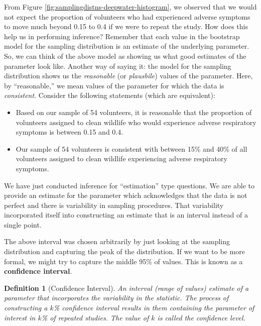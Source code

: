\documentclass[
]{book}
\providecommand{\tightlist}{%
  \setlength{\itemsep}{0pt}\setlength{\parskip}{0pt}}
\theoremstyle{plain}
\theoremstyle{mydefn}
\newtheorem{definition}{Definition}[chapter]
\theoremstyle{myexmpl}
\theoremstyle{remark}
\begin{document}
From Figure \ref{fig:samplingdistns-deepwater-histogram}, we observed that we would not expect the proportion of volunteers who had experienced adverse symptoms to move much beyond 0.15 to 0.4 if we were to repeat the study. How does this help us in performing inference? Remember that each value in the bootstrap model for the sampling distribution is an estimate of the underlying parameter. So, we can think of the above model as showing us what good estimates of the parameter look like. Another way of saying it: the model for the sampling distribution shows us the \emph{reasonable} (or \emph{plausbile}) values of the parameter. Here, by ``reasonable,'' we mean values of the parameter for which the data is \emph{consistent}. Consider the following statements (which are equivalent):

\begin{itemize}
\tightlist
\item
  Based on our sample of 54 volunteers, it is reasonable that the proportion of volunteers assigned to clean wildlife who would experience adverse respiratory symptoms is between 0.15 and 0.4.
\item
  Our sample of 54 volunteers is consistent with between 15\% and 40\% of all volunteers assigned to clean wildlife experiencing adverse respiratory symptoms.
\end{itemize}

We have just conducted inference for ``estimation'' type questions. We are able to provide an estimate for the parameter which acknowledges that the data is not perfect and there is variability in sampling procedures. That variability incorporated itself into constructing an estimate that is an interval instead of a single point.

The above interval was chosen arbitrarily by just looking at the sampling distribution and capturing the peak of the distribution. If we want to be more formal, we might try to capture the middle 95\% of values. This is known as a \textbf{confidence interval}.

\begin{definition}[Confidence Interval]
\protect\hypertarget{def:defn-confidence-interval}{}{\label{def:defn-confidence-interval} {} }An interval (range of values) estimate of a parameter that incorporates the variability in the statistic. The process of constructing a \(k\)\% confidence interval results in them containing the parameter of interest in \(k\)\% of repeated studies. The value of \(k\) is called the \emph{confidence level}.
\end{definition}
\end{document}
